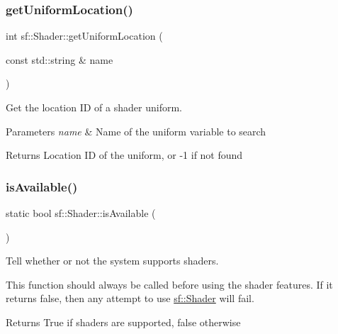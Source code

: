 \subsubsection{\texorpdfstring{getUniformLocation()}{getUniformLocation()}}
{\footnotesize\ttfamily int sf\+::\+Shader\+::get\+Uniform\+Location (\begin{DoxyParamCaption}\item[{const std\+::string \&}]{name }\end{DoxyParamCaption})\hspace{0.3cm}{\ttfamily [private]}}



Get the location ID of a shader uniform. 


\begin{DoxyParams}{Parameters}
{\em name} & Name of the uniform variable to search\\
\hline
\end{DoxyParams}
\begin{DoxyReturn}{Returns}
Location ID of the uniform, or -\/1 if not found \begin{DoxyVerb}\end{DoxyVerb}
 
\end{DoxyReturn}
\mbox{\label{classsf_1_1_shader_ad22474690bafe4a305c1b9826b1bd86a}} 
\subsubsection{\texorpdfstring{isAvailable()}{isAvailable()}}
{\footnotesize\ttfamily static bool sf\+::\+Shader\+::is\+Available (\begin{DoxyParamCaption}{ }\end{DoxyParamCaption})\hspace{0.3cm}{\ttfamily [static]}}



Tell whether or not the system supports shaders. 

This function should always be called before using the shader features. If it returns false, then any attempt to use \mbox{\hyperlink{classsf_1_1_shader}{sf\+::\+Shader}} will fail.

\begin{DoxyReturn}{Returns}
True if shaders are supported, false otherwise \begin{DoxyVerb}\end{DoxyVerb}
 
\end{DoxyReturn}
\mbox{\label{classsf_1_1_shader_a45db14baf1bbc688577f81813b1fce96}} 
